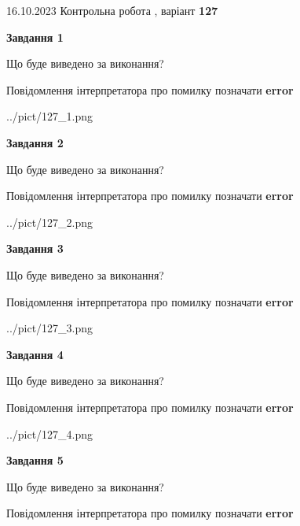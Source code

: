 \documentclass[12pt, ukrainian]{article}
\begin{document}
{\Large{16.10.2023 Контрольна робота , варіант  \No \textbf { 127 }\par}}
{
\begin {large}
{\begin {center}\textbf{Завдання 1}\end {center}}\par
Що буде виведено за виконання? \par
Повідомлення інтерпретатора про помилку позначати \textbf{error}

\begin{center}
	{../pict/127_1.png}
\end{center}
\newpage

{\begin {center}\textbf{Завдання 2}\end {center}}\par
Що буде виведено за виконання? \par
Повідомлення інтерпретатора про помилку позначати \textbf{error}

\begin{center}
	{../pict/127_2.png}
\end{center}
\newpage

{\begin {center}\textbf{Завдання 3}\end {center}}\par
Що буде виведено за виконання? \par
Повідомлення інтерпретатора про помилку позначати \textbf{error}

\begin{center}
	{../pict/127_3.png}
\end{center}
\newpage

{\begin {center}\textbf{Завдання 4}\end {center}}\par
Що буде виведено за виконання? \par
Повідомлення інтерпретатора про помилку позначати \textbf{error}

\begin{center}
	{../pict/127_4.png}
\end{center}
\newpage

{\begin {center}\textbf{Завдання 5}\end {center}}\par
Що буде виведено за виконання? \par
Повідомлення інтерпретатора про помилку позначати \textbf{error}


\end{large}}
\end{document}
